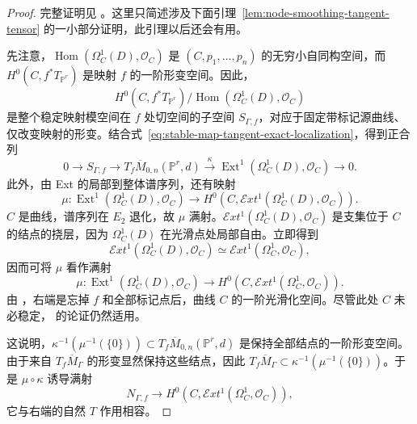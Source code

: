 \begin{proof}
完整证明见 。这里只简述涉及下面引理~\ref{lem:node-smoothing-tangent-tensor} 的一小部分证明，此引理以后还会有用。

先注意，$\operatorname{Hom}(\Omega_C^1(D),\mathcal O_C)$ 是 $(C,p_1,\ldots,p_n)$ 的无穷小自同构空间，而 $H^0(C,f^*T_{\mathbb P^r})$ 是映射 $f$ 的一阶形变空间。因此，
\[
H^0(C,f^*T_{\mathbb P^r})/\operatorname{Hom}(\Omega_C^1(D),\mathcal O_C)
\]
是整个稳定映射模空间在 $f$ 处切空间的子空间 $S_{\Gamma,f}$，对应于固定带标记源曲线、仅改变映射的形变。结合式~\eqref{eq:stable-map-tangent-exact-localization}，得到正合列
\[
0\longrightarrow S_{\Gamma,f}\longrightarrow T_f\overline M_{0,n}(\mathbb P^r,d)
\xrightarrow{\kappa}\operatorname{Ext}^1(\Omega_C^1(D),\mathcal O_C)\longrightarrow0.
\]
此外，由 Ext 的局部到整体谱序列，还有映射
\[
\mu:\operatorname{Ext}^1(\Omega_C^1(D),\mathcal O_C)
\longrightarrow H^0(C,\mathcal E xt^1(\Omega_C^1(D),\mathcal O_C)).
\]
$C$ 是曲线，谱序列在 $E_2$ 退化，故 $\mu$ 满射。$\mathcal E xt^1(\Omega_C^1(D),\mathcal O_C)$ 是支集位于 $C$ 的结点的挠层，因为 $\Omega_C^1(D)$ 在光滑点处局部自由。立即得到
\[
\mathcal E xt^1(\Omega_C^1(D),\mathcal O_C)\simeq\mathcal E xt^1(\Omega_C^1,\mathcal O_C),
\]
因而可将 $\mu$ 看作满射
\[
\mu:\operatorname{Ext}^1(\Omega_C^1(D),\mathcal O_C)
\longrightarrow H^0(C,\mathcal E xt^1(\Omega_C^1,\mathcal O_C)).
\]
由 ，右端是忘掉 $f$ 和全部标记点后，曲线 $C$ 的一阶光滑化空间。尽管此处 $C$ 未必稳定， 的论证仍然适用。

这说明，$\kappa^{-1}(\mu^{-1}(\{0\}))\subset T_f\overline M_{0,n}(\mathbb P^r,d)$ 是保持全部结点的一阶形变空间。由于来自 $T_f\overline M_\Gamma$ 的形变显然保持这些结点，因此 $T_f\overline M_\Gamma\subset\kappa^{-1}(\mu^{-1}(\{0\}))$。于是 $\mu\circ\kappa$ 诱导满射
\[
N_{\Gamma,f}\longrightarrow H^0(C,\mathcal E xt^1(\Omega_C^1,\mathcal O_C)),
\]
它与右端的自然 $T$ 作用相容。


\end{proof}
